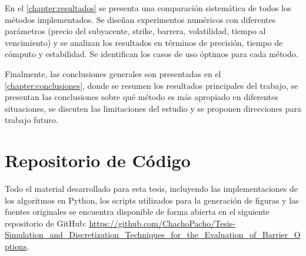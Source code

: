 En el \autoref{chapter:resultados} se presenta una comparación sistemática de todos los métodos implementados. Se diseñan experimentos numéricos con diferentes parámetros (precio del subyacente, strike, barrera, volatilidad, tiempo al vencimiento) y se analizan los resultados en términos de precisión, tiempo de cómputo y estabilidad. Se identifican los casos de uso óptimos para cada método.

Finalmente, las conclusiones generales son presentadas en el \autoref{chapter:conclusiones}, donde se resumen los resultados principales del trabajo, se presentan las conclusiones sobre qué método es más apropiado en diferentes situaciones, se discuten las limitaciones del estudio y se proponen direcciones para trabajo futuro.

\section{Repositorio de Código}

Todo el material desarrollado para esta tesis, incluyendo las implementaciones de los algoritmos en Python, los scripts utilizados para la generación de figuras y las fuentes originales se encuentra disponible de forma abierta en el siguiente repositorio de GitHub: \url{https://github.com/ChachoPacho/Tesis-Simulation_and_Discretization_Techniques_for_the_Evaluation_of_Barrier_Options}.
